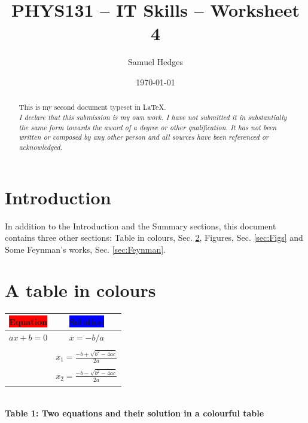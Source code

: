 \documentclass[12pt]{article}
\begin{document}
    \title{PHYS131 -- IT Skills -- Worksheet 4}
    \author{Samuel Hedges}
    \date{\today}
    \maketitle

    \begin{abstract}
    This is my second document typeset in \LaTeX.\\ \textit{I declare that this submission is my own work. I have not submitted it in substantially the same form towards the award of a degree or other qualification. It has not been written or composed by any other person and all sources have been referenced or acknowledged.}
    \end{abstract}

    \tableofcontents

\section{Introduction}

In addition to the Introduction and the Summary sections, this document contains three other sections:  Table in colours, Sec. \ref{sec:TabCol},  Figures, Sec. \ref{sec:Figs} and Some Feynman's works, Sec. \ref{sec:Feynman}.

\section{A table in colours}
\label{sec:TabCol}
\begin{center}
    \begin{tabular}{|c|c|}
    \hline
\color{white} \colorbox{red}{Equation}  &\color{white} \colorbox{blue}{Solution} \\ \hline
\color{red} $ax + b = 0$ &\color{blue} $x = -b/a$\\ \hline
\color{red} \multirow {5}{*}{$ax^{2} + bx + c = 0$} &\\ 
 &\color{blue}$x_{1} = \frac{-b + \sqrt{b^{2}-4ac}}{2a}$ \\
& \\
 &\color{blue}$x_{2} = \frac{-b - \sqrt{b^{2}-4ac}}{2a}$\\
&\\ \hline

    \end{tabular}
    \\\textbf{Table 1: Two equations and their solution in a colourful table}
\end{center}
\end{document}
